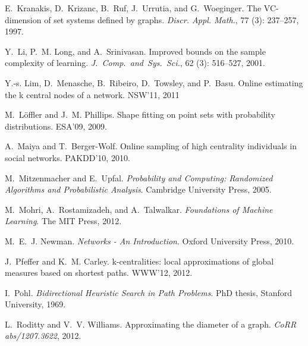 \begin{thebibliography}{33}
E.~Kranakis, D.~Krizanc, B.~Ruf, J.~Urrutia, and G.~Woeginger.
\newblock The {VC}-dimension of set systems defined by graphs.
\newblock \emph{Discr. Appl. Math.}, 77 (3):
  237--257, 1997.

Y.~Li, P.~M. Long, and A.~Srinivasan.
\newblock Improved bounds on the sample complexity of learning.
\newblock \emph{J.~Comp.~and~Sys.~Sci.}, 62
  (3): 516--527, 2001.

Y.-s. Lim, D.~Menasche, B.~Ribeiro, D.~Towsley, and P.~Basu.
\newblock Online estimating the k central nodes of a network.
\newblock NSW'11, 2011

M.~L\"{o}ffler and J.~M. Phillips.
\newblock Shape fitting on point sets with probability distributions.
\newblock ESA'09, 2009.

A.~Maiya and T.~Berger-Wolf.
\newblock Online sampling of high centrality individuals in social networks.
\newblock PAKDD'10, 2010.

M.~Mitzenmacher and E.~Upfal.
\newblock \emph{Probability and Computing: Randomized Algorithms and
  Probabilistic Analysis}.
\newblock Cambridge University Press, 2005.

M.~Mohri, A.~Rostamizadeh, and A.~Talwalkar.
\newblock \emph{Foundations of Machine Learning}.
\newblock The MIT Press, 2012.

M.~E.~J. Newman.
\newblock \emph{Networks - An Introduction}.
\newblock Oxford University Press, 2010.

J.~Pfeffer and K.~M. Carley.
\newblock k-centralities: local approximations of global measures based on
  shortest paths.
\newblock WWW'12, 2012.

I.~Pohl.
\newblock \emph{Bidirectional Heuristic Search in Path Problems}.
\newblock PhD thesis, Stanford University, 1969.

L.~Roditty and V.~V. Williams.
\newblock Approximating the diameter of a graph.
\newblock \emph{CoRR abs/1207.3622}, 2012.


\end{thebibliography}
